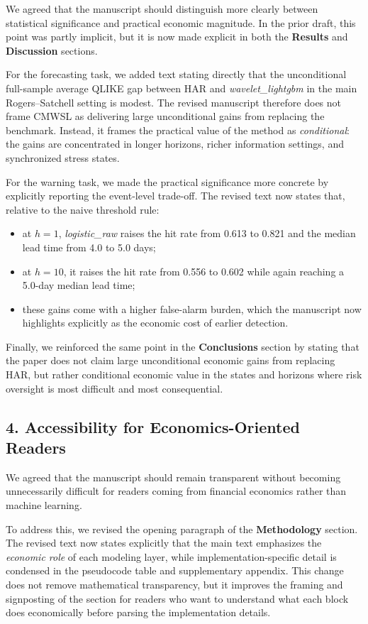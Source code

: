 \documentclass[11pt,a4paper]{article}
\begin{document}
We agreed that the manuscript should distinguish more clearly between statistical significance and practical economic magnitude. In the prior draft, this point was partly implicit, but it is now made explicit in both the \textbf{Results} and \textbf{Discussion} sections.

For the forecasting task, we added text stating directly that the unconditional full-sample average QLIKE gap between HAR and \textit{wavelet\_lightgbm} in the main Rogers--Satchell setting is modest. The revised manuscript therefore does not frame CMWSL as delivering large unconditional gains from replacing the benchmark. Instead, it frames the practical value of the method as \emph{conditional}: the gains are concentrated in longer horizons, richer information settings, and synchronized stress states.

For the warning task, we made the practical significance more concrete by explicitly reporting the event-level trade-off. The revised text now states that, relative to the naive threshold rule:
\begin{itemize}[leftmargin=1.5em]
\item at $h=1$, \textit{logistic\_raw} raises the hit rate from 0.613 to 0.821 and the median lead time from 4.0 to 5.0 days;
\item at $h=10$, it raises the hit rate from 0.556 to 0.602 while again reaching a 5.0-day median lead time;
\item these gains come with a higher false-alarm burden, which the manuscript now highlights explicitly as the economic cost of earlier detection.
\end{itemize}

Finally, we reinforced the same point in the \textbf{Conclusions} section by stating that the paper does not claim large unconditional economic gains from replacing HAR, but rather conditional economic value in the states and horizons where risk oversight is most difficult and most consequential.

\subsection*{4. Accessibility for Economics-Oriented Readers}

We agreed that the manuscript should remain transparent without becoming unnecessarily difficult for readers coming from financial economics rather than machine learning.

To address this, we revised the opening paragraph of the \textbf{Methodology} section. The revised text now states explicitly that the main text emphasizes the \emph{economic role} of each modeling layer, while implementation-specific detail is condensed in the pseudocode table and supplementary appendix. This change does not remove mathematical transparency, but it improves the framing and signposting of the section for readers who want to understand what each block does economically before parsing the implementation details.
\end{document}
